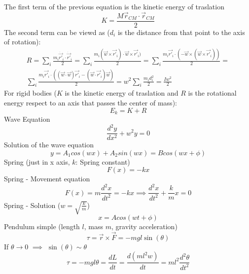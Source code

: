 \documentclass{article}
\begin{document}
The first term of the previous equation is the kinetic energy of traslation
\begin{equation}
  K = \frac{M\vec{r}_{CM} \cdot \vec{r}_{CM}}{2}
\end{equation}
The second term can be viewd as ($d_i$ is the distance from that point to the axis of rotation):
\begin{equation}
  \begin{split}
   R = \sum_i \frac{m_i \dot{\vec{r'}}_i \cdot \dot{\vec{r'}}_i}{2} =  \sum_i \frac{m_i (\vec{w}\times\vec{r'}_i) \cdot \vec{w}\times\vec{r'}_i)}{2} = \sum_i \frac{m_i \vec{r'}_i \cdot (-\vec{w} \times (\vec{w} \times \vec{r'}_i))}{2} = \\\sum_i \frac{m_i \vec{r'}_i \cdot ((\vec{w}\cdot\vec{w}) \vec{r'}_i - (\vec{w}\cdot\vec{r'}_i) \vec{w})}{2} = w^2\sum_i \frac{m_id_i^2}{2} = \frac{Iw^2}{2} 
  \end{split}
\end{equation}
For rigid bodies ($K$ is the kinetic energy of traslation and $R$ is the rotational energy respect to an axis that passes the center of mass):
\begin{equation}
  E_k = K + R
\end{equation}
Wave Equation
\begin{equation}
  \frac{d^2y}{dx^2} + w^2y = 0
\end{equation}
Solution of the wave equation
\begin{equation}
    y = A_1cos(wx) + A_2sin(wx) =  Bcos(wx+ \phi)
\end{equation}
Spring (just in x axis, $k$: Spring constant)
\begin{equation}
  F(x) = -kx
\end{equation}
Spring - Movement equation
\begin{equation}
  F(x) = m\frac{d^2x}{dt^2} = -kx \implies \frac{d^2x}{dt^2} + \frac{k}{m}x = 0
\end{equation}
Spring - Solution ($w = \sqrt{\frac{k}{m}}$)
\begin{equation}
  x = Acos(wt + \phi)
\end{equation}
Pendulum simple (length $l$, mass $m$, gravity acceleration)
\begin{equation}
  \tau = \vec{r} \times \vec{F} = -mgl\sin(\theta)
\end{equation}
If $\theta \to 0$ $\implies$ $\sin(\theta) \sim \theta$
\begin{equation}
  \tau = -mgl\theta = \frac{dL}{dt} = \frac{d(ml^2w)}{dt} = ml^2\frac{d^2\theta}{dt^2}
\end{equation}
\end{document}
